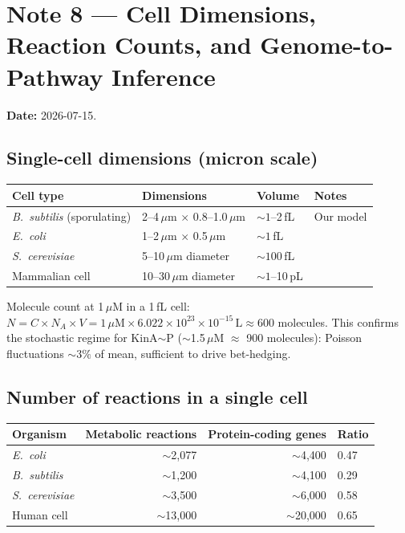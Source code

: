 \documentclass[11pt,a4paper]{article}
\begin{document}
\section*{Note 8 — Cell Dimensions, Reaction Counts, and Genome-to-Pathway Inference}

\textbf{Date:} 2026-07-15.

\subsection*{Single-cell dimensions (micron scale)}

\begin{center}
\begin{tabular}{llll}
\toprule
Cell type & Dimensions & Volume & Notes \\
\midrule
\textit{B.~subtilis} (sporulating) & 2--4\,$\mu$m $\times$ 0.8--1.0\,$\mu$m & $\sim1$--2\,fL & Our model \\
\textit{E.~coli} & 1--2\,$\mu$m $\times$ 0.5\,$\mu$m & $\sim1$\,fL & \\
\textit{S.~cerevisiae} & 5--10\,$\mu$m diameter & $\sim100$\,fL & \\
Mammalian cell & 10--30\,$\mu$m diameter & $\sim1$--10\,pL & \\
\bottomrule
\end{tabular}
\end{center}

Molecule count at 1\,$\mu$M in a 1\,fL cell:
$N = C \times N_A \times V = 1\,\mu\text{M} \times 6.022\times10^{23}
\times 10^{-15}\,\text{L} \approx 600$ molecules.
This confirms the stochastic regime for KinA$\sim$P ($\sim$1.5\,$\mu$M
$\approx$ 900 molecules): Poisson fluctuations $\sim 3\%$ of mean,
sufficient to drive bet-hedging.

\subsection*{Number of reactions in a single cell}

\begin{center}
\begin{tabular}{lrrl}
\toprule
Organism & Metabolic reactions & Protein-coding genes & Ratio \\
\midrule
\textit{E.~coli} & $\sim$2,077 & $\sim$4,400 & 0.47 \\
\textit{B.~subtilis} & $\sim$1,200 & $\sim$4,100 & 0.29 \\
\textit{S.~cerevisiae} & $\sim$3,500 & $\sim$6,000 & 0.58 \\
Human cell & $\sim$13,000 & $\sim$20,000 & 0.65 \\
\bottomrule
\end{tabular}
\end{center}
\end{document}
